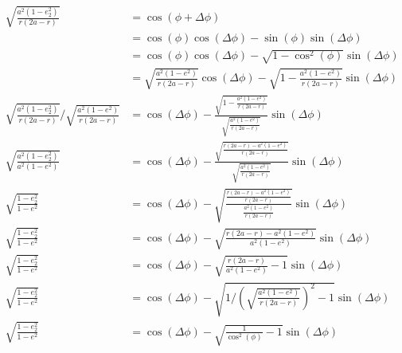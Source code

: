 \documentclass[../basicOrbitalDynamics.tex]{subfiles}
\begin{document}
\begin{align*}
    \sqrt{\frac{a^2(1-e_2^2)}{r(2a-r)}}                                   & =\cos(\phi+\Delta \phi)                                                                                                 \\
                                                                          & =\cos(\phi)\cos(\Delta \phi)-\sin(\phi)\sin(\Delta \phi)                                                                \\
                                                                          & =\cos(\phi)\cos(\Delta \phi)-\sqrt{1-\cos^2(\phi)}\sin(\Delta \phi)                                                     \\
                                                                          & =\sqrt{\frac{a^2(1-e^2)}{r(2a-r)}}\cos(\Delta \phi)-\sqrt{1-\frac{a^2(1-e^2)}{r(2a-r)}}\sin(\Delta \phi)                \\
    \sqrt{\frac{a^2(1-e_2^2)}{r(2a-r)}}/\sqrt{\frac{a^2(1-e^2)}{r(2a-r)}} & =\cos(\Delta \phi)-\frac{\sqrt{1-\frac{a^2(1-e^2)}{r(2a-r)}}}{\sqrt{\frac{a^2(1-e^2)}{r(2a-r)}}}\sin(\Delta \phi)       \\
    \sqrt{\frac{a^2(1-e_2^2)}{a^2(1-e^2)}}                                & =\cos(\Delta \phi)-\frac{\sqrt{\frac{r(2a-r)-a^2(1-e^2)}{r(2a-r)}}}{\sqrt{\frac{a^2(1-e^2)}{r(2a-r)}}}\sin(\Delta \phi) \\
    \sqrt{\frac{1-e_2^2}{1-e^2}}                                          & =\cos(\Delta \phi)-\sqrt{\frac{\frac{r(2a-r)-a^2(1-e^2)}{r(2a-r)}}{\frac{a^2(1-e^2)}{r(2a-r)}}}\sin(\Delta \phi)        \\
    \sqrt{\frac{1-e_2^2}{1-e^2}}                                          & =\cos(\Delta \phi)-\sqrt{\frac{r(2a-r)-a^2(1-e^2)}{a^2(1-e^2)}}\sin(\Delta \phi)                                        \\
    \sqrt{\frac{1-e_2^2}{1-e^2}}                                          & =\cos(\Delta \phi)-\sqrt{\frac{r(2a-r)}{a^2(1-e^2)}-1}\sin(\Delta \phi)                                                 \\
    \sqrt{\frac{1-e_2^2}{1-e^2}}                                          & =\cos(\Delta \phi)-\sqrt{1/\left(\sqrt{\frac{a^2(1-e^2)}{r(2a-r)}}\right)^2-1}\sin(\Delta \phi)                         \\
    \sqrt{\frac{1-e_2^2}{1-e^2}}                                          & =\cos(\Delta \phi)-\sqrt{\frac{1}{\cos^2(\phi)}-1}\sin(\Delta \phi)                                                     \\

\end{align*}
\end{document}

